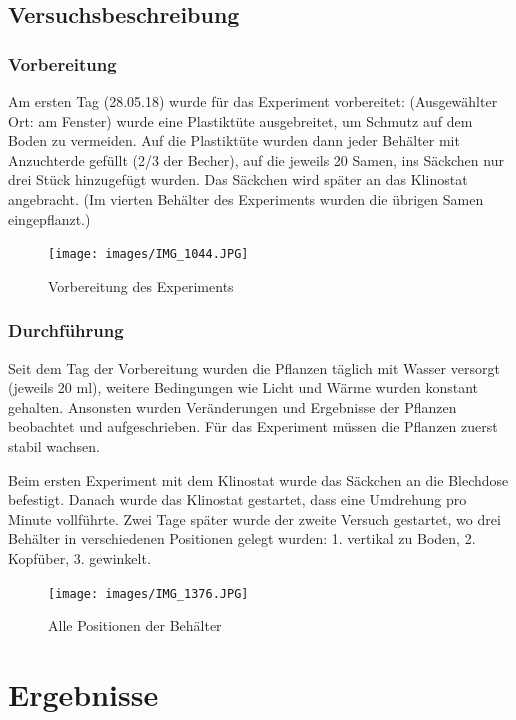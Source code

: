 \documentclass[
11pt, 
ngerman,
listof=totocnumbered,
oneside,
bibliography=totocnumbered,
abstracton
]{scrreprt}
\begin{document}
\subsection{Versuchsbeschreibung}

\subsubsection{Vorbereitung}

Am ersten Tag (28.05.18) wurde für das Experiment vorbereitet: (Ausgewählter Ort: am Fenster) wurde eine Plastiktüte ausgebreitet, um Schmutz auf dem Boden zu vermeiden. Auf die Plastiktüte wurden dann jeder Behälter mit Anzuchterde gefüllt (2/3 der Becher), auf die jeweils 20 Samen, ins Säckchen  nur drei Stück hinzugefügt wurden. Das Säckchen wird später an das Klinostat angebracht. (Im vierten Behälter des Experiments wurden die übrigen Samen eingepflanzt.)


\begin{figure}[H]
	\centering 
	\texttt{[image: images/IMG\_1044.JPG]}
	\caption{Vorbereitung des Experiments}
\end{figure}


\subsubsection{Durchführung}

Seit dem Tag der Vorbereitung wurden die Pflanzen täglich mit Wasser versorgt (jeweils 20 ml), weitere Bedingungen wie Licht und Wärme wurden konstant gehalten. Ansonsten wurden Veränderungen und Ergebnisse der Pflanzen beobachtet und aufgeschrieben.
Für das Experiment müssen die Pflanzen zuerst stabil wachsen.

Beim ersten Experiment mit dem Klinostat wurde das Säckchen an die Blechdose befestigt. Danach wurde das Klinostat gestartet, dass eine Umdrehung pro Minute vollführte. Zwei Tage später wurde der zweite Versuch gestartet, wo drei Behälter in verschiedenen Positionen gelegt wurden: 1. vertikal zu Boden, 2. Kopfüber, 3. gewinkelt.


\begin{figure}[H]
	\centering 
	\texttt{[image: images/IMG\_1376.JPG]}
	\caption{Alle Positionen der Behälter}
\end{figure} 


\section{Ergebnisse}
\end{document}
